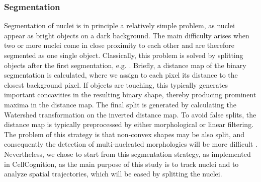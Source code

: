 \subsubsection{Segmentation}
Segmentation of nuclei is in principle a relatively simple problem, as
nuclei appear as bright objects on a dark background. The
main difficulty arises when two or more nuclei come in close proximity
to each other and are therefore segmented as one single object. Classically,
this problem is solved by splitting objects after the first
segmentation, e.g. \cite{cellcognition}. 
Briefly, a distance map of the binary segmentation is
calculated, where we assign to each pixel its distance to the closest
background pixel. If objects are touching, this typically generates
important concavities in the resulting binary shape, thereby producing
prominent maxima in the distance map. The final split is generated by
calculating the Watershed transformation on the inverted distance
map. To avoid false splits, the distance map is typically preprocessed
by either morphological or linear filtering. The problem of this
strategy is that non-convex shapes may be also split, and consequently
the detection of multi-nucleated morphologies will be more
difficult \cite{Walter2010}. Nevertheless, we chose to start from this segmentation
strategy, as implemented in CellCognition, as the main purpose of this
study is to track nuclei and to analyze spatial trajectories, which
will be eased by splitting the nuclei. 



